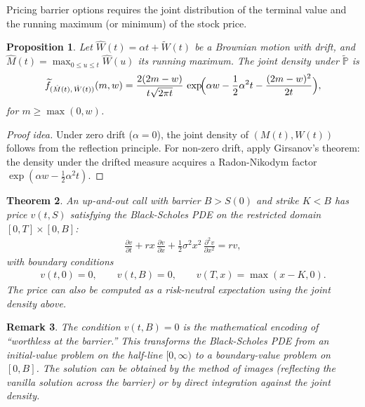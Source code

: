 \documentclass{report}
\theoremstyle{spacedplain}
\newtheorem{theorem}{Theorem}[section]
\newtheorem{proposition}[theorem]{Proposition}
\theoremstyle{spaceddefinition}
\theoremstyle{spacedremark}
\newtheorem{remark}[theorem]{Remark}
\begin{document}
Pricing barrier options requires the joint distribution of the terminal value and the running maximum (or minimum) of the stock price.

\begin{proposition}
Let $\hat{W}(t) = \alpha t + \widetilde{W}(t)$ be a Brownian motion with drift, and $\hat{M}(t) = \max_{0 \leq u \leq t} \hat{W}(u)$ its running maximum. The joint density under $\widetilde{\mathbb{P}}$ is
\begin{align}
    \widetilde{f}_{(\hat{M}(t),\,\hat{W}(t))}(m,w) = \frac{2(2m-w)}{t\sqrt{2\pi t}}\,\exp\!\Bigl(\alpha w - \frac{1}{2}\alpha^2 t - \frac{(2m-w)^2}{2t}\Bigr),
\end{align}
for $m \geq \max(0,w)$.
\end{proposition}

\begin{proof}[Proof idea]
Under zero drift ($\alpha = 0$), the joint density of $(M(t), W(t))$ follows from the reflection principle. For non-zero drift, apply Girsanov's theorem: the density under the drifted measure acquires a Radon-Nikodym factor $\exp(\alpha w - \frac{1}{2}\alpha^2 t)$.
\end{proof}

\begin{theorem}
An up-and-out call with barrier $B > S(0)$ and strike $K < B$ has price $v(t,S)$ satisfying the Black-Scholes PDE on the restricted domain $[0,T] \times [0,B]$:
\begin{align}
    \frac{\partial v}{\partial t} + rx\,\frac{\partial v}{\partial x} + \frac{1}{2}\sigma^2 x^2\,\frac{\partial^2 v}{\partial x^2} = rv,
\end{align}
with boundary conditions
\begin{align}
    v(t,0) = 0, \qquad v(t,B) = 0, \qquad v(T,x) = \max(x-K,0).
\end{align}
The price can also be computed as a risk-neutral expectation using the joint density above.
\end{theorem}

\begin{remark}
The condition $v(t,B) = 0$ is the mathematical encoding of ``worthless at the barrier.'' This transforms the Black-Scholes PDE from an initial-value problem on the half-line $[0,\infty)$ to a boundary-value problem on $[0,B]$. The solution can be obtained by the method of images (reflecting the vanilla solution across the barrier) or by direct integration against the joint density.
\end{remark}
\end{document}
